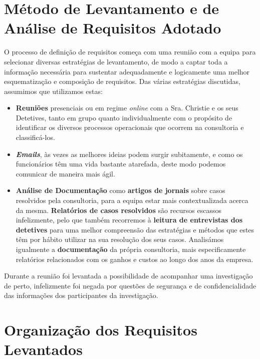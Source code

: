 \documentclass[a4paper,12pt]{scrreprt}
\begin{document}
    \section{Método de Levantamento e de Análise de Requisitos Adotado}
        \label{sec:2.1}
            O processo de definição de requisitos começa com uma reunião com a equipa para selecionar diversas estratégias de levantamento, de modo a captar toda a informação necessária para sustentar adequadamente e logicamente uma melhor esquematização e composição de requisitos. Das várias estratégias discutidas, assumimos que utilizamos estas:
            \begin{itemize}
            \item \textbf{Reuniões} presenciais ou em regime \textit{online} com a Sra$.$ Christie e os seus Detetives, tanto em grupo quanto individualmente com o propósito de identificar os diversos processos operacionais que ocorrem na consultoria e classificá-los.
            \item \textit{\textbf{Emails}}, às vezes as melhores ideias podem surgir subitamente, e como os funcionários têm uma vida bastante atarefada, deste modo podemos comunicar de maneira mais ágil.
            \item \textbf{Análise de Documentação} como \textbf{artigos de jornais} sobre casos resolvidos pela consultoria, para a equipa estar mais contextualizada acerca da mesma.
            \textbf{Relatórios de casos resolvidos} são recursos escassos infelizmente, pelo que também recorremos à \textbf{leitura de entrevistas dos detetives} para uma melhor compreensão das estratégias e métodos que estes têm por hábito utilizar na sua resolução dos seus casos. Analisámos igualmente a \textbf{documentação} da própria consultoria, mais especificamente relatórios relacionados com os ganhos e custos ao longo dos anos da empresa.
            \end{itemize}
            
            Durante a reunião foi levantada a possibilidade de acompanhar uma investigação de perto, infelizmente foi negada por questões de segurança e de confidencialidade das informações dos participantes da investigação. 
            

    \section{Organização dos Requisitos Levantados}
        \label{sec:2.2}
\end{document}
